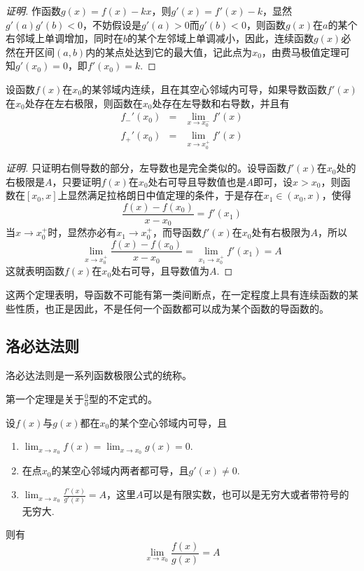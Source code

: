 \begin{proof}[证明]
  作函数$g(x)=f(x)-kx$，则$g'(x)=f'(x)-k$，显然$g'(a)g'(b)<0$，不妨假设是$g'(a)>0$而$g'(b)<0$，则函数$g(x)$在$a$的某个右邻域上单调增加，同时在$b$的某个左邻域上单调减小，因此，连续函数$g(x)$必然在开区间$(a,b)$内的某点处达到它的最大值，记此点为$x_0$，由费马极值定理可知$g'(x_0)=0$，即$f'(x_0)=k$.
\end{proof}

\begin{theorem}
  设函数$f(x)$在$x_0$的某邻域内连续，且在其空心邻域内可导，如果导数函数$f'(x)$在$x_0$处存在左右极限，则函数在$x_0$处存在左导数和右导数，并且有
  \begin{eqnarray*}
   f_-'(x_0) & = & \lim_{x \to x_0^-} f'(x)  \\
   f_+'(x_0) & = & \lim_{x \to x_0^+} f'(x) 
  \end{eqnarray*}
\end{theorem}

\begin{proof}[证明]
  只证明右侧导数的部分，左导数也是完全类似的。设导函数$f'(x)$在$x_0$处的右极限是$A$，只要证明$f(x)$在$x_0$处右可导且导数值也是$A$即可，设$x>x_0$，则函数在$[x_0,x]$上显然满足拉格朗日中值定理的条件，于是存在$x_1 \in (x_0,x)$，使得
  \[ \frac{f(x)-f(x_0)}{x-x_0} = f'(x_1) \]
  当$x \to x_0^+$时，显然亦必有$x_1 \to x_0^+$，而导函数$f'(x)$在$x_0$处有右极限为$A$，所以
  \[ \lim_{x \to x_0^+} \frac{f(x)-f(x_0)}{x-x_0} = \lim_{x_1 \to x_0^+} f'(x_1) = A \]
  这就表明函数$f(x)$在$x_0$处右可导，且导数值为$A$.
\end{proof}

这两个定理表明，导函数不可能有第一类间断点，在一定程度上具有连续函数的某些性质，也正是因此，不是任何一个函数都可以成为某个函数的导函数的。

\subsection{洛必达法则}
\label{sec:L'Hopital-rule}

洛必达法则是一系列函数极限公式的统称。

第一个定理是关于$\frac{0}{0}$型的不定式的。
\begin{theorem}
  设$f(x)$与$g(x)$都在$x_0$的某个空心邻域内可导，且
  \begin{enumerate}
  \item $\lim_{x \to x_0} f(x) = \lim_{x \to x_0} g(x) = 0$.
  \item 在点$x_0$的某空心邻域内两者都可导，且$g'(x) \neq 0$.
  \item $\lim_{x \to x_0} \frac{f'(x)}{g'(x)}=A$，这里$A$可以是有限实数，也可以是无穷大或者带符号的无穷大.
  \end{enumerate}
  则有
  \[ \lim_{x \to x_0} \frac{f(x)}{g(x)} = A \]
\end{theorem}


